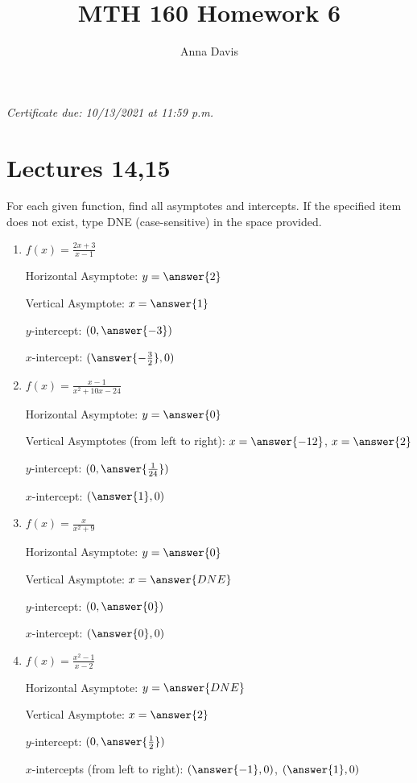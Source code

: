 \documentclass{ximera}
\author{Anna Davis} \title{MTH 160 Homework 6}
\begin{document}
\begin{abstract}

\end{abstract}
\maketitle
 \textit{Certificate due: 10/13/2021 at 11:59 p.m.}
 \section{Lectures 14,15}
 
 \begin{problem}\label{prob:160hom6prob2} 
 For each given function, find all asymptotes and intercepts.   If the specified item does not exist, type DNE (case-sensitive) in the space provided.  
  \begin{enumerate}
\item
$f(x)=\frac{2x+3}{x-1}$

Horizontal Asymptote: $y=\answer{2}$

Vertical Asymptote: $x=\answer{1}$

$y$-intercept: $(0, \answer{-3})$

$x$-intercept: $(\answer{-\frac{3}{2}},0)$

\item
$f(x)=\frac{x-1}{x^2+10x-24}$

Horizontal Asymptote: $y=\answer{0}$

Vertical Asymptotes (from left to right): $x=\answer{-12}$, $x=\answer{2}$

$y$-intercept: $(0, \answer{\frac{1}{24}})$

$x$-intercept: $(\answer{1},0)$
\item
$f(x)=\frac{x}{x^2+9}$

Horizontal Asymptote: $y=\answer{0}$

Vertical Asymptote: $x=\answer{DNE}$

$y$-intercept: $(0, \answer{0})$

$x$-intercept: $(\answer{0},0)$

\item
$f(x)=\frac{x^2-1}{x-2}$

Horizontal Asymptote: $y=\answer{DNE}$

Vertical Asymptote: $x=\answer{2}$

$y$-intercept: $(0, \answer{\frac{1}{2}})$

$x$-intercepts (from left to right): $(\answer{-1},0)$, $(\answer{1},0)$
  \end{enumerate}
\end{problem}
 
 
\end{document}
